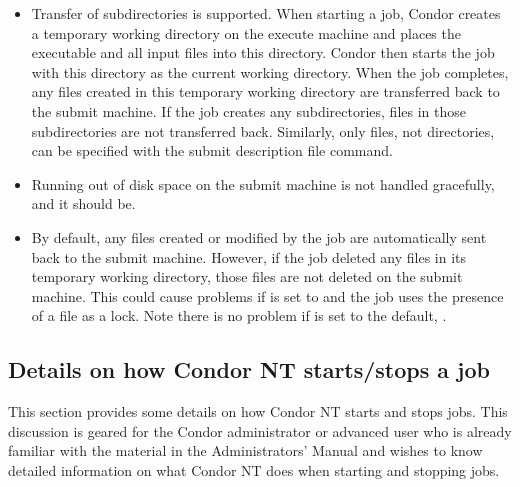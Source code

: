 \begin{itemize}

\item Transfer of subdirectories is supported.  When starting a job,
Condor creates a temporary working directory on the execute machine and
places the executable and all input files into this directory.
Condor 
then starts the job with this directory as the current working directory.
When the job completes, any files created in this temporary working
directory are transferred back to the submit machine.
If the job creates any subdirectories,
files in those subdirectories are not transferred back.
Similarly, only files, not directories, can be
specified with the  submit description file
command.

\item Running out of disk space on the submit machine is not handled 
gracefully, and it should be. 

\item By default, any files created or modified by the job are automatically
sent back to the submit machine. 
However, if the job deleted any files in
its temporary working directory, 
those files are not deleted on the submit machine.
This could cause problems if 
 is set to  and the job uses the presence
of a file as a lock.
Note there is no problem if 
is set to the default, .

\end{itemize}

\subsection{Details on how Condor NT starts/stops a job}

This section provides some details on how Condor NT starts and stops jobs.
This discussion is geared for the Condor administrator or advanced user who is
already familiar with the material in the Administrators' Manual
and wishes to know detailed information on what Condor NT does when
starting and stopping jobs.

